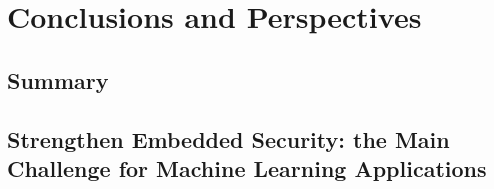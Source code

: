 
\chapter{Conclusions and Perspectives} %

\label{ChapterConclusions}



\section{Summary}


\section{Strengthen Embedded Security: the Main Challenge for Machine Learning Applications}
